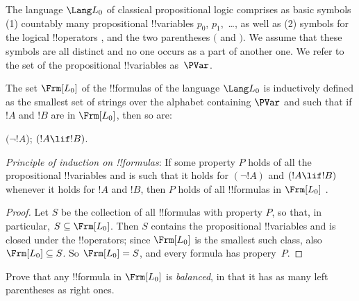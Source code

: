 \documentclass[../../../include/open-logic-section]{subfiles}
\begin{document}


The language $\Lang L_0$ of classical propositional logic
comprises as basic symbols (1) countably many propositional !!{variable}s
$p_0$, $p_1$,~\dots, as well as (2) symbols for the logical !!{operator}s
  \startycommalist
  ,
 and the two parentheses $($ and
$)$. We assume that these symbols are all distinct and no one occurs as
a part of another one. We refer to the set of the propositional
!!{variable}s as~$\PVar$.

\begin{defn} [Formulas]
The set $\Frm[L_0]$ of the !!{formula}s of the language
  $\Lang L_0$ is inductively defined as the smallest set of strings
  over the alphabet containing $\PVar$ and such that
  if $!A$ and $!B$ are in $\Frm[L_0]$, then so are:
\begin{enumerate}
 {$(\lnot !A$);}{}
 {$(!A \lif !B)$.}{}
\end{enumerate}
\end{defn}     
                        
\begin{thm} 
\emph{Principle of induction on !!{formula}s}: If some
  property $P$ holds of all the propositional !!{variable}s and is such
  that it holds for $(\lnot !A)$ and $(!A \lif !B)$
  whenever it holds for $!A$ and $!B$, then $P$ holds of all
 !!{formula}s in $\Frm[L_0]$ .
\end{thm}

\begin{proof}
  Let $S$ be the collection of all !!{formula}s with property $P$, so
  that, in particular, $S \subseteq \Frm[L_0]$. Then $S$ contains
  the propositional !!{variable}s and is closed under the !!{operator}s;
  since $\Frm[L_0]$ is the smallest such class, also
  $\Frm[L_0]\subseteq S$. So $\Frm[L_0] = S$, and every
  formula has propery~$P$.
\end{proof}

\begin{prob} 
Prove that any !!{formula} in $\Frm[L_0]$ is \emph{balanced}, in
that it has as many left parentheses as right ones.
\end{prob}
\end{document}
